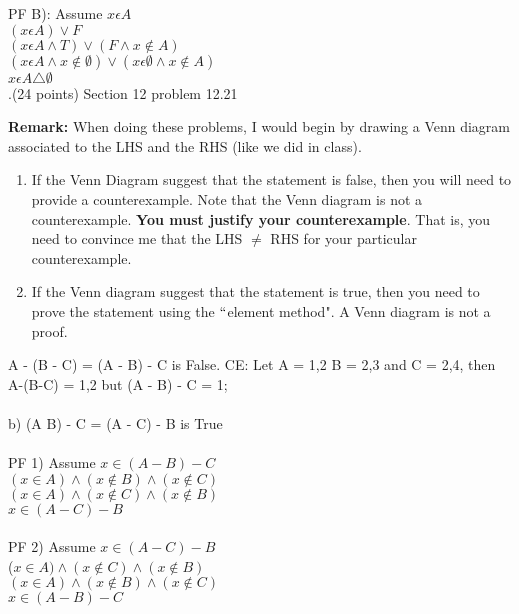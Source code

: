 \documentclass[12pt]{article}
\begin{document}
\item PF B): Assume $x \epsilon A$ \\ 
\rightarrow $(x \epsilon A) \vee F$ \\ 
\rightarrow $(x \epsilon A \wedge T) \vee (F \wedge x \notin A)$ \\
\rightarrow $(x \epsilon A \wedge x \notin \emptyset) \vee (x \epsilon \emptyset \wedge x \notin A)$ \\ 
\rightarrow $x\epsilon A \triangle \emptyset$ \;\; \square \\ 




.(24 points)  Section 12 problem 12.21
\vspace{.15in}

\noindent \textbf{Remark:} When doing these problems, I would begin by drawing a Venn diagram associated to the LHS and the RHS (like we did in class). 
\begin{enumerate}
    \item If the Venn Diagram suggest that the statement is false, then you will need to provide a counterexample.  Note that the Venn diagram is not a counterexample.  \textbf{You must justify your counterexample}.  That is, you need to convince me that the LHS $\neq$ RHS for your particular counterexample. 
    \item If the Venn diagram suggest that the statement is true, then you need to prove the statement using the $``$element method".  A Venn diagram is not a proof.  
\end{enumerate}
\noindent A - (B - C) = (A - B) - C is False. CE: Let A = 1,2 B = 2,3 and C = 2,4, then A-(B-C) = 1,2 but (A - B) - C = 1; \\ 
\\
b) (A B) - C = (A - C) - B is True \\
\\
PF 1) Assume $x \in (A-B) - C$ \\
$(x \in A) \wedge (x \notin B) \wedge (x \notin C)$\\
$(x \in A) \wedge (x \notin C) \wedge (x \notin B)$\\
$x \in (A - C) - B$ \\
\\
PF 2) Assume $x \in (A - C) -B$\\
($x \in A) \wedge (x \notin C) \wedge (x \notin B)$ \\
$(x \in A) \wedge (x \notin B)\wedge (x \notin C)$ \\
$x \in (A - B) - C$\\
\end{document}
